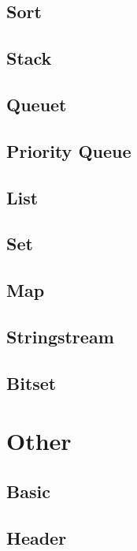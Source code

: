 \subsection{Sort}


\subsection{Stack}


\subsection{Queuet}


\subsection{Priority Queue}


\subsection{List}


\subsection{Set}


\subsection{Map}


\subsection{Stringstream}


\subsection{Bitset}






\section{Other}

\subsection{Basic}


\subsection{Header}



